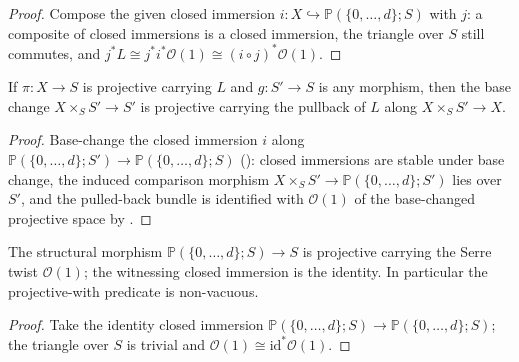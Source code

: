 \begin{proof}
  \leanok
  Compose the given closed immersion \(i : X \hookrightarrow
  \mathbb{P}(\{0,\dots,d\}; S)\) with \(j\): a composite of closed
  immersions is a closed immersion, the triangle over \(S\) still commutes,
  and \(j^* L \cong j^* i^* \mathcal{O}(1) \cong (i \circ j)^*
  \mathcal{O}(1)\).
\end{proof}

\begin{lemma}
  \label{lem:projective_with_base_change}
  \leanok
  If \(\pi : X \to S\) is projective carrying \(L\) and \(g : S' \to S\) is
  any morphism, then the base change \(X \times_S S' \to S'\) is projective
  carrying the pullback of \(L\) along \(X \times_S S' \to X\).
\end{lemma}

\begin{proof}
  \leanok
  Base-change the closed immersion \(i\) along
  \(\mathbb{P}(\{0,\dots,d\}; S') \to \mathbb{P}(\{0,\dots,d\}; S)\)
  (): closed immersions are stable
  under base change, the induced comparison morphism
  \(X \times_S S' \to \mathbb{P}(\{0,\dots,d\}; S')\) lies over \(S'\), and
  the pulled-back bundle is identified with \(\mathcal{O}(1)\) of the
  base-changed projective space by .
\end{proof}

\begin{lemma}
  \label{lem:projective_space_is_projective}
  \leanok
  The structural morphism \(\mathbb{P}(\{0,\dots,d\}; S) \to S\) is projective
  carrying the Serre twist \(\mathcal{O}(1)\); the witnessing closed immersion
  is the identity.  In particular the projective-with predicate is
  non-vacuous.
\end{lemma}

\begin{proof}
  \leanok
  Take the identity closed immersion
  \(\mathbb{P}(\{0,\dots,d\}; S) \to \mathbb{P}(\{0,\dots,d\}; S)\); the
  triangle over \(S\) is trivial and \(\mathcal{O}(1) \cong
  \mathrm{id}^* \mathcal{O}(1)\).
\end{proof}

